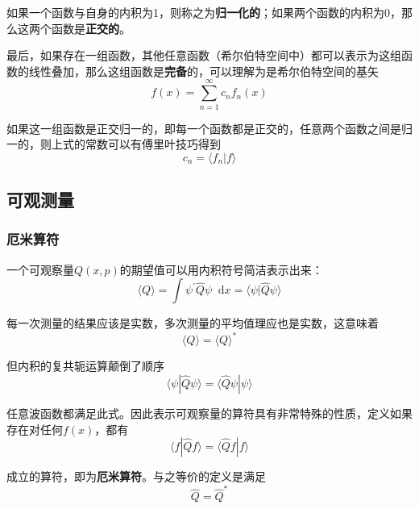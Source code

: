 \documentclass[UTF8]{ctexart}
\begin{document}
    如果一个函数与自身的内积为1，则称之为\textbf{归一化的}；如果两个函数的内积为0，那么这两个函数是\textbf{正交的}。

    最后，如果存在一组函数，其他任意函数（希尔伯特空间中）都可以表示为这组函数的线性叠加，那么这组函数是\textbf{完备}的，可以理解为是希尔伯特空间的基矢
    \begin{equation}
        f(x) = \sum_{n=1}^{\infty} c_n f_n(x)
    \end{equation}

\noindent 如果这一组函数是正交归一的，即每一个函数都是正交的，任意两个函数之间是归一的，则上式的常数可以有傅里叶技巧得到
\begin{equation}
    c_n = \langle f_n | f \rangle
\end{equation}

    \subsection{可观测量}
    \subsubsection{厄米算符}
    一个可观察量$Q(x,p)$的期望值可以用内积符号简洁表示出来：
    \begin{equation}
        \langle Q\rangle=\int \psi^{\prime} \hat{Q} \psi \mathop{}\!\mathrm{d}  x=\langle\psi | \hat{Q} \psi\rangle
        \end{equation}

\noindent 每一次测量的结果应该是实数，多次测量的平均值理应也是实数，这意味着
\begin{equation}
    \langle Q \rangle = \langle Q \rangle^*
\end{equation}

\noindent 但内积的复共轭运算颠倒了顺序
\begin{equation}
    \langle\psi | \hat{Q} \psi\rangle=\langle\hat{Q} \psi | \psi\rangle
    \end{equation}

\noindent 任意波函数都满足此式。因此表示可观察量的算符具有非常特殊的性质，定义如果存在对任何$f(x)$，都有
\begin{equation}
    \langle f | \hat{Q} f\rangle=\langle\hat{Q} f | f\rangle
    \end{equation}

\noindent 成立的算符，即为\textbf{厄米算符}。与之等价的定义是满足
\begin{equation}
    \hat{Q} = \hat{Q}^*
\end{equation}
\end{document}
